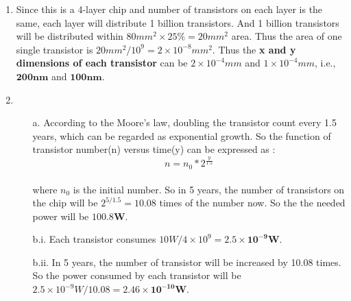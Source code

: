 



 \begin{enumerate}
   \item Since this is a 4-layer chip and number of transistors on each layer is the same, each layer will distribute 1 billion transistors. And 1 billion transistors will be distributed within $ 80 mm^2 \times 25\% = 20 mm^2 $ area. Thus the area of one single transistor is $20mm^2/10^9=2\times10^{-8}mm^2$. Thus the \textbf{x and y dimensions of each transistor} can be $2\times10^{-4}mm$ and $1\times10^{-4}mm$, i.e., $\mathbf{200nm}$ and $\mathbf{100nm}$.
   
   \item 
    \begin{enumerate}
        \item[a.]According to the Moore's law, doubling the transistor count every 1.5 years, which can be regarded as exponential growth. So the function of transistor number(n) versus time(y) can be expressed as : $$ n=n_0 * 2^{\frac{y}{1.5}} $$ \\ where $n_0$ is the initial number. So in 5 years, the number of transistors on the chip will be $2^{5/1.5}=10.08$ times of the number now.  So the the needed power will be $\mathbf{100.8W}$.
        \item[b.i.]Each transistor consumes $10W/4\times10^9=\mathbf{2.5\times10^{-9}W}$.  
        \item[b.ii.]In 5 years, the number of transistor will be increased by 10.08 times. So the power consumed by each transistor will be $2.5\times10^{-9}W/10.08=\mathbf{2.46\times10^{-10}W}$.
    \end{enumerate}
    

\end{enumerate}
